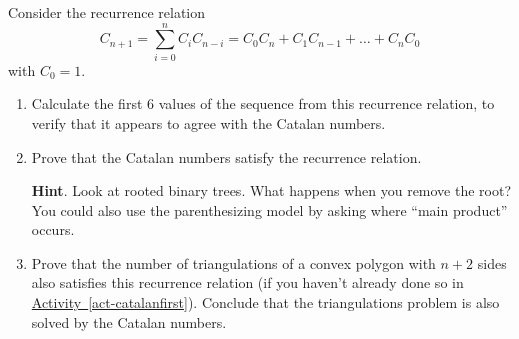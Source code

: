 \documentclass{book}
\begin{document}
\setcounter{cpjt}{181}
\addtocounter{cpjt}{-1}
\begin{activity}\label{activity-174}
\hypertarget{p-1020}{}%
Consider the recurrence relation%
\begin{equation*}
C_{n + 1} = \sum_{i = 0}^n C_iC_{n-i} = C_{0}C_{n} + C_{1}C_{n - 1} + \ldots + C_{n}C_{0}
\end{equation*}
with \(C_0 = 1\).%
\begin{enumerate}[font=\bfseries,label=(\alph*),ref=\alph*]
\item\label{task-189} \hypertarget{p-1021}{}%
Calculate the first 6 values of the sequence from this recurrence relation, to verify that it appears to agree with the Catalan numbers.%
\item\label{task-190} \hypertarget{p-1022}{}%
Prove that the Catalan numbers satisfy the recurrence relation.%
\par\smallskip%
\noindent\textbf{Hint}.\hypertarget{hint-121}{}\quad%
\hypertarget{p-1023}{}%
Look at rooted binary trees.  What happens when you remove the root?  You could also use the parenthesizing model by asking where ``main product'' occurs.%
\item\label{task-191} \hypertarget{p-1024}{}%
Prove that the number of triangulations of a convex polygon with \(n+2\) sides also satisfies this recurrence relation (if you haven't already done so in \hyperref[act-catalanfirst]{Activity~\ref{act-catalanfirst}}).  Conclude that the triangulations problem is also solved by the Catalan numbers.%
\end{enumerate}
\end{activity}

\clearpage
\end{document}
